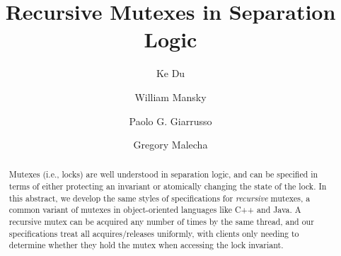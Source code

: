 \documentclass[sigplan,screen]{acmart}
\begin{document}
\title{Recursive Mutexes in Separation Logic}

\author{Ke Du}

\author{William Mansky}

\author{Paolo G. Giarrusso}

\author{Gregory Malecha}

\renewcommand{\shortauthors}{Du et al.}

\newcommand{\mutexR}{\ensuremath{\mathsf{rmutex}}}

\begin{abstract}
Mutexes (i.e., locks) are well understood in separation logic, and can be specified in terms of either protecting an invariant or atomically changing the state of the lock. In this abstract, we develop the same styles of specifications for \emph{recursive} mutexes, a common variant of mutexes in object-oriented languages like C++ and Java. A recursive mutex can be acquired any number of times by the same thread, and our specifications treat all acquires/releases uniformly, with clients only needing to determine whether they hold the mutex when accessing the lock invariant.
\end{abstract}
\end{document}
